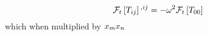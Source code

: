 \documentclass[
  letterpaper,
  DIV=11,
  numbers=noendperiod,
  oneside]{scrreprt}
\begin{document}
\[
\mathtip{\mathcal{F}_{t}\left[\texttip{\texttip{T}{Stress-Energy tensor, or energy-momentum tensor}_{ij}}{covariant Stress-Energy tensor component}\right]}{\text{Fourier transform of $\texttip{\texttip{T}{Stress-Energy tensor, or energy-momentum tensor}_{ij}}{covariant Stress-Energy tensor component}$ in variable $t$: }{\mathcal{F}_{t}\left[\texttip{\texttip{T}{Stress-Energy tensor, or energy-momentum tensor}_{ij}}{covariant Stress-Energy tensor component}\right] = \int \,\mathrm{d}^{}t\, \texttip{\texttip{T}{Stress-Energy tensor, or energy-momentum tensor}_{ij}}{covariant Stress-Energy tensor component}(t) \oldexp{\mathtip{{\mathring{\imath}}}{\text{Complex unit: } {\mathring{\imath}}^2 = -1}\omega \cdot t}   }}\texttip{{}^{,ij}}{Partial derivative}=-\omega^2\mathtip{\mathcal{F}_{t}\left[\texttip{\texttip{T}{Stress-Energy tensor, or energy-momentum tensor}_{00}}{covariant Stress-Energy tensor component}\right]}{\text{Fourier transform of $\texttip{\texttip{T}{Stress-Energy tensor, or energy-momentum tensor}_{00}}{covariant Stress-Energy tensor component}$ in variable $t$: }{\mathcal{F}_{t}\left[\texttip{\texttip{T}{Stress-Energy tensor, or energy-momentum tensor}_{00}}{covariant Stress-Energy tensor component}\right] = \int \,\mathrm{d}^{}t\, \texttip{\texttip{T}{Stress-Energy tensor, or energy-momentum tensor}_{00}}{covariant Stress-Energy tensor component}(t) \oldexp{\mathtip{{\mathring{\imath}}}{\text{Complex unit: } {\mathring{\imath}}^2 = -1}\omega \cdot t}   }}
\] which when multiplied by
\(\texttip{x_{m}}{covariant mathbftor component}\texttip{x_{n}}{covariant mathbftor component}\)
\end{document}
